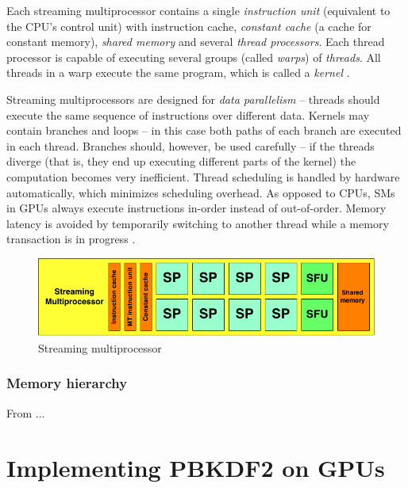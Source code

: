 \documentclass[12pt,oneside]{fithesis2}
\begin{document}
      Each streaming multiprocessor contains a single \emph{instruction unit} (equivalent to the CPU's control unit) with instruction cache, \emph{constant cache} (a cache for constant memory), \emph{shared memory} and several \emph{thread processors}. Each thread processor is capable of executing several groups (called \emph{warps}) of \emph{threads}. All threads in a warp execute the same program, which is called a \emph{kernel} \cite{nvidia:gpuArch}.
      
      
      Streaming multiprocessors are designed for \emph{data parallelism} -- threads should execute the same sequence of instructions over different data. Kernels may contain branches and loops -- in this case both paths of each branch are executed in each thread. Branches should, however, be used carefully -- if the threads diverge (that is, they end up executing different parts of the kernel) the computation becomes very inefficient. Thread scheduling is handled by hardware automatically, which minimizes scheduling overhead. As opposed to CPUs, SMs in GPUs always execute instructions in-order instead of out-of-order. Memory latency is avoided by temporarily switching to another thread while a memory transaction is in progress \cite{nvidia:gpuArch}.
      
      \begin{figure}
        \centering
        \includegraphics[width=\linewidth]{images/sm.png}
        \caption{Streaming multiprocessor}
      \end{figure}
      
      \subsection{Memory hierarchy}
      From ...
      
    \chapter{Implementing PBKDF2 on GPUs}
\end{document}
